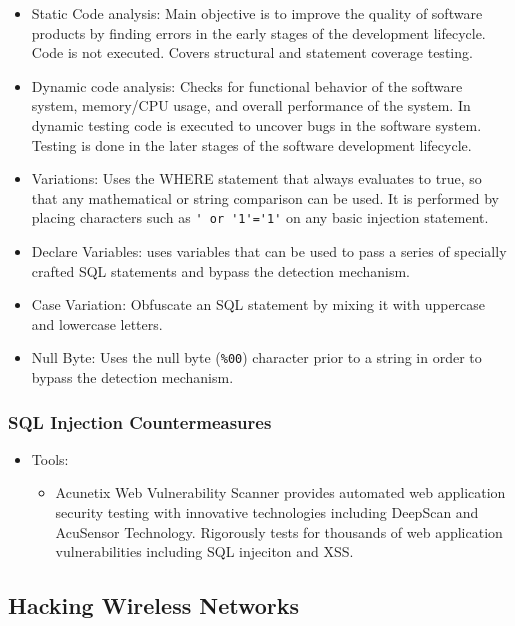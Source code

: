 \begin{itemize}
    \item Static Code analysis: Main objective is to improve the quality of software products by finding errors in the early stages of the development lifecycle. Code is not executed. Covers structural and statement coverage testing.
    \item Dynamic code analysis: Checks for functional behavior of the software system, memory/CPU usage, and overall performance of the system. In dynamic testing code is executed to uncover bugs in the software system. Testing is done in the later stages of the software development lifecycle.
    \item Variations: Uses the WHERE statement that always evaluates to true, so that any mathematical or string comparison can be used. It is performed by placing characters such as \verb|' or '1'='1'| on any basic injection statement.
    \item Declare Variables: uses variables that can be used to pass a series of specially crafted SQL statements and bypass the detection mechanism.
    \item Case Variation: Obfuscate an SQL statement by mixing it with uppercase and lowercase letters.
    \item Null Byte: Uses the null byte (\verb|%00|) character prior to a string in order to bypass the detection mechanism.
\end{itemize}
\subsubsection{SQL Injection Countermeasures}
\begin{itemize}
    \item Tools:
    \begin{itemize}
        \item Acunetix Web Vulnerability Scanner provides automated web application security testing with innovative technologies including DeepScan and AcuSensor Technology. Rigorously tests for thousands of web application vulnerabilities including SQL injeciton and XSS.
    \end{itemize}
\end{itemize}


\subsection{Hacking Wireless Networks}
